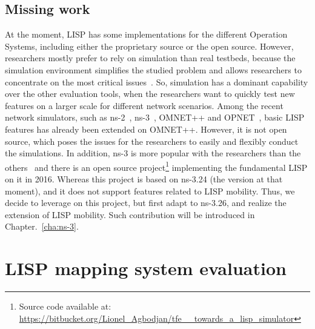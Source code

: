 \subsection{Missing work}
\label{subsec:implementation_missing}
At the moment, LISP has some implementations for the different Operation Systems, including either the proprietary source or the open source. However, researchers mostly prefer to rely on simulation than real testbeds, because the simulation environment simplifies the studied problem and allows researchers to concentrate on the most critical issues~\cite{moller2011simulation}. So, simulation has a dominant capability over the other evaluation tools, when the researchers want to quickly test new features on a larger scale for different network scenarios. Among the recent network simulators, such as ns-2~\cite{breslau2000advances}, ns-3~\cite{henderson2008network}, OMNET++ and OPNET~\cite{chang1999network}, basic LISP features has already been extended on OMNET++. However, it is not open source, which poses the issues for the researchers to easily and flexibly conduct the simulations. In addition, ns-3 is more popular with the researchers than the others~\cite{rana2017implementation} and there is an open source project\footnote{Source code available at:\\ \url{https://bitbucket.org/Lionel_Agbodjan/tfe__towards_a_lisp_simulator}} implementing the fundamental LISP on it in 2016. Whereas this project is based on ns-3.24 (the version at that moment), and it does not support features related to LISP mobility. Thus, we decide to leverage on this project, but first adapt to ns-3.26, and realize the extension of LISP mobility. Such contribution will be introduced in Chapter.~\ref{cha:ns-3}. 

\section{LISP mapping system evaluation}
\label{sec:mds}


